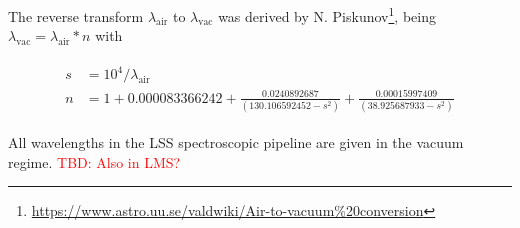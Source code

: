 The reverse transform $\lambda_\textrm{air}$ to $\lambda_\textrm{vac}$ was derived by N. Piskunov\footnote{\url{https://www.astro.uu.se/valdwiki/Air-to-vacuum\%20conversion}}, being $\lambda_\textrm{vac}=\lambda_\textrm{air}*n$ with 

\begin{eqnarray}\label{eq:vac2air}
\left.\begin{aligned}
    s&=10^4 / \lambda_{\textrm{air}}\\
    n&=1 + 0.000083366242 + \frac{0.0240892687}{(130.106592452 - s^2)} + \frac{0.00015997409}{(38.925687933 - s^2)}
\end{aligned}\right.
\end{eqnarray}

All wavelengths in the \ac{LSS} spectroscopic pipeline are given in the vacuum regime. \textcolor{red}{TBD: Also in LMS?}


